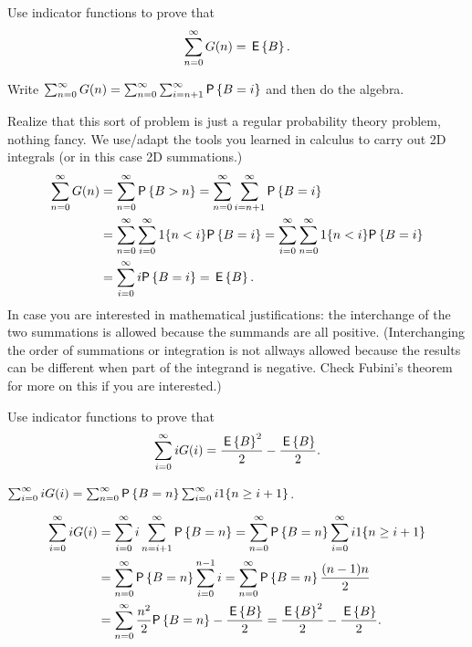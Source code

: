 \begin{exercise}\label{ex:6}
 Use indicator functions to prove that
    \begin{equation*}
      \sum_{n=0}^\infty G(n) = \,\mathsf{E}\left\{B\right\}.
    \end{equation*}
    \begin{hint}
Write 
$\sum_{n=0}^\infty G(n) = \sum_{n=0}^\infty \sum_{i=n+1}^\infty \P{B=i}$ and then do the algebra.
    \end{hint}
\begin{solution}
  Realize that this sort of problem is just a regular probability
  theory problem, nothing fancy. We use/adapt the tools you learned in
  calculus to carry out 2D integrals (or in this case 2D summations.)
\begin{align*}
\sum_{n=0}^\infty G(n) 
&= \sum_{n=0}^\infty \P{B>n} 
= \sum_{n=0}^\infty \sum_{i=n+1}^\infty \P{B=i}  \\
& = \sum_{n=0}^\infty \sum_{i=0}^\infty 1\{n<i\} \P{B=i} 
= \sum_{i=0}^\infty \sum_{n=0}^\infty 1 \{n<i\} \P{B=i} \\
&= \sum_{i=0}^\infty i \P{B=i} = \E B.
\end{align*}
In case you are interested in mathematical justifications: the
interchange of the two summations is allowed because the summands are
all positive. (Interchanging the order of summations or integration is
not allways allowed because the results can be different when part of
the integrand is negative. Check Fubini's theorem for more on this if
you are interested.)
\end{solution}
\end{exercise}

\begin{exercise}\label{ex:66}
 Use indicator functions to prove that
    \begin{equation*}
\sum_{i=0}^\infty i G(i) =  \frac{\,\mathsf{E}\left\{B\right\}^2}2 - \frac{\,\mathsf{E}\left\{B\right\}}{2}.
    \end{equation*}
    \begin{hint}
$\sum_{i=0}^\infty i G(i) = \sum_{n=0}^\infty \P{B=n} \sum_{i=0}^\infty i 1\{n\geq i+1\}$.
    \end{hint}
\begin{solution}
\begin{align*}
\sum_{i=0}^\infty i G(i)
&= \sum_{i=0}^\infty i \sum_{n=i+1}^\infty \P{B=n} = \sum_{n=0}^\infty \P{B=n} \sum_{i=0}^\infty i 1\{n\geq i+1\} \\
&= \sum_{n=0}^\infty \P{B=n} \sum_{i=0}^{n-1}i  = \sum_{n=0}^\infty \P{B=n} \frac{(n-1)n}{2} \\
&= \sum_{n=0}^\infty  \frac{n^2}{2} \P{B=n} - \frac{\E B}{2}
= \frac{\E B^2}2 - \frac{\E B}{2}.
\end{align*}
\end{solution}
\end{exercise}



